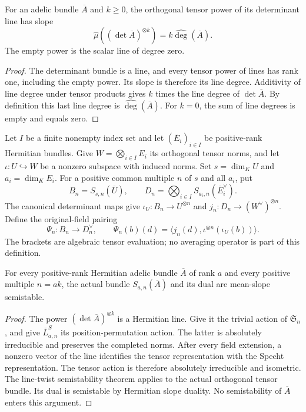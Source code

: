 \begin{lemma}
\label{lem:determinant-power-slope}
\leanok
For an adelic bundle $\overline A$ and $k\geq0$, the orthogonal tensor power
of its determinant line has slope
\[
 \widehat\mu((\det\overline A)^{\otimes k})
      =k\widehat{\deg}(\overline A).
\]
The empty power is the scalar line of degree zero.
\end{lemma}
\begin{proof}
The determinant bundle is a line, and every tensor power of lines has rank
one, including the empty power. Its slope is therefore its line degree.
Additivity of line degree under tensor products gives $k$ times the line
degree of $\det\overline A$. By definition this last line degree is
$\widehat{\deg}(\overline A)$. For $k=0$, the sum of line degrees is empty
and equals zero.
\end{proof}

Let $I$ be a finite nonempty index set and let $(\overline E_i)_{i\in I}$ be
positive-rank Hermitian bundles. Give
$W=\bigotimes_{i\in I}E_i$ its orthogonal tensor norms, and let
$\iota:U\hookrightarrow W$ be a nonzero subspace with induced norms.
Set $s=\dim_K U$ and $a_i=\dim_K E_i$. For a positive common multiple $n$ of
$s$ and all $a_i$, put
\[
 B_n=S_{s,n}(\overline U),\qquad
 D_n=\bigotimes_{i\in I}S_{a_i,n}(\overline E_i^{\vee}).
\]
The canonical determinant maps give
$\iota_U:B_n\to U^{\otimes n}$ and
$j_n:D_n\to(W^{\vee})^{\otimes n}$. Define the original-field pairing
\[
 \Psi_n:B_n\longrightarrow D_n^{\vee},\qquad
 \Psi_n(b)(d)=\langle j_n(d),\iota^{\otimes n}(\iota_U(b))\rangle.
\]
The brackets are algebraic tensor evaluation; no averaging operator is part
of this definition.

\begin{lemma}
\label{lem:determinant-specht-semistability}
\leanok
For every positive-rank Hermitian adelic bundle $\overline A$ of rank $a$
and every positive multiple $n=ak$, the actual bundle
$S_{a,n}(\overline A)$ and its dual are mean-slope semistable.
\end{lemma}
\begin{proof}
The power $(\det\overline A)^{\otimes k}$ is a Hermitian line. Give it the
trivial action of $\mathfrak S_n$, and give $\overline L^S_{a,n}$ its
position-permutation action. The latter is absolutely irreducible and
preserves the completed norms. After every field extension, a nonzero vector
of the line identifies the tensor representation with the Specht
representation. The tensor action is therefore absolutely irreducible and
isometric. The line-twist semistability theorem applies to the actual
orthogonal tensor bundle. Its dual is semistable by Hermitian slope duality.
No semistability of $\overline A$ enters this argument.
\end{proof}

